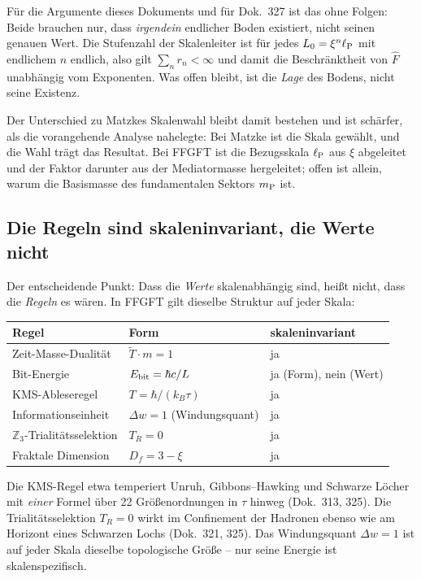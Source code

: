Für die Argumente dieses Dokuments und für Dok.~327 ist das ohne Folgen:
Beide brauchen nur, dass \emph{irgendein} endlicher Boden existiert, nicht
seinen genauen Wert. Die Stufenzahl der Skalenleiter ist für jedes
$L_0 = \xi^n\ell_{\mathrm{P}}$ mit endlichem $n$ endlich, also gilt $\sum_n r_n < \infty$
und damit die Beschränktheit von $\hat F$ unabhängig vom Exponenten.
Was offen bleibt, ist die \emph{Lage} des Bodens, nicht seine Existenz.

Der Unterschied zu Matzkes Skalenwahl bleibt damit bestehen und ist
schärfer, als die vorangehende Analyse nahelegte: Bei Matzke ist die
Skala gewählt, und die Wahl trägt das Resultat. Bei FFGFT ist die
Bezugsskala $\ell_{\mathrm{P}}$ aus $\xi$ abgeleitet und der Faktor darunter aus der
Mediatormasse hergeleitet; offen ist allein, warum die Basismasse des
fundamentalen Sektors $m_{\mathrm{P}}$ ist.

\subsection{Die Regeln sind skaleninvariant, die Werte nicht}

Der entscheidende Punkt: Dass die \emph{Werte} skalenabhängig sind,
heißt nicht, dass die \emph{Regeln} es wären. In FFGFT gilt dieselbe
Struktur auf jeder Skala:

\begin{center}
\small
\begin{tabular}{@{}lll@{}}
  \toprule
  \textbf{Regel} & \textbf{Form} & \textbf{skaleninvariant} \\
  \midrule
  Zeit-Masse-Dualität & $\tilde T\cdot m = 1$ & ja \\
  Bit-Energie & $E_{\mathrm{bit}} = \hbar c/L$ & ja (Form), nein (Wert) \\
  KMS-Ableseregel & $T = \hbar/(k_B\tau)$ & ja \\
  Informationseinheit & $\Delta w = 1$ (Windungsquant) & ja \\
  $\mathbb{Z}_3$-Trialitätsselektion & $T_R = 0$ & ja \\
  Fraktale Dimension & $D_f = 3-\xi$ & ja \\
  \bottomrule
\end{tabular}
\end{center}

Die KMS-Regel etwa temperiert Unruh, Gibbons--Hawking und Schwarze Löcher
mit \emph{einer} Formel über 22 Größenordnungen in $\tau$ hinweg
(Dok.~313, 325). Die Trialitätsselektion $T_R = 0$ wirkt im Confinement
der Hadronen ebenso wie am Horizont eines Schwarzen Lochs (Dok.~321, 325).
Das Windungsquant $\Delta w = 1$ ist auf jeder Skala dieselbe
topologische Größe -- nur seine Energie ist skalenspezifisch.

